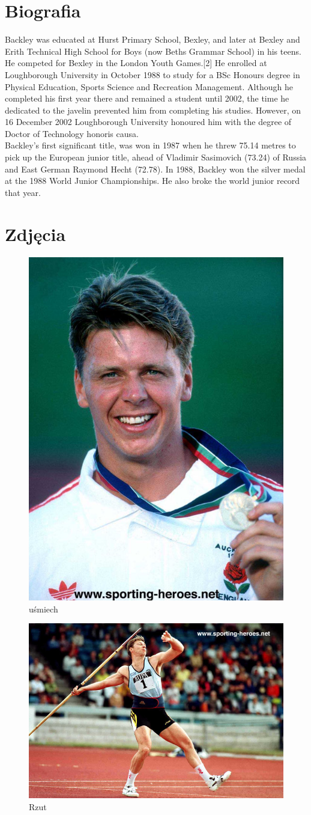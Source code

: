 \documentclass{article}
\begin{document}
\section{Biografia}
Backley was educated at Hurst Primary School, Bexley, and later at Bexley and Erith Technical High School for Boys (now Beths Grammar School) in his teens. He competed for Bexley in the London Youth Games.[2] He enrolled at Loughborough University in October 1988 to study for a BSc Honours degree in Physical Education, Sports Science and Recreation Management. Although he completed his first year there and remained a student until 2002, the time he dedicated to the javelin prevented him from completing his studies. However, on 16 December 2002 Loughborough University honoured him with the degree of Doctor of Technology honoris causa.\\

Backley's first significant title, was won in 1987 when he threw 75.14 metres to pick up the European junior title, ahead of Vladimir Sasimovich (73.24) of Russia and East German Raymond Hecht (72.78). In 1988, Backley won the silver medal at the 1988 World Junior Championships. He also broke the world junior record that year.

\section{Zdjęcia}


\begin{figure}
\centering
\includegraphics[width=0.5\hsize]{1.jpg}
\caption{uśmiech}\label{fig:1}
\end{figure}

\begin{figure}
\centering
\includegraphics[width=0.5\hsize]{2.jpg}
\caption{Rzut}\label{fig:2}
\end{figure}
\end{document}
